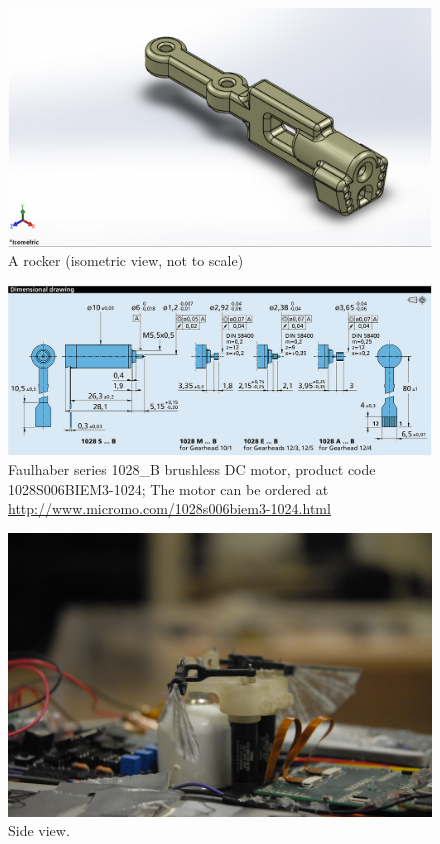 \begin{appendix}
\begin{figure}
\centering
\includegraphics[width=\textwidth]{Files/Figures/rocker.png}
\caption{A rocker (isometric view, not to scale)}
\label{fig:rocker}
\end{figure}

\begin{figure}
\centering
\includegraphics[width=17cm, angle=90]{Files/Figures/motor_drawing.png}
\caption[Faulhaber series 1028B DC motor]{Faulhaber series 1028\_B brushless DC motor, product code 1028S006BIEM3-1024; The motor can be ordered at \url{http://www.micromo.com/1028s006biem3-1024.html}}
\label{fig_drawing_motor}
\end{figure}

\begin{figure}
\centering
\includegraphics[width=12.5cm]{Files/Figures/photo_side.jpg}
\caption{Side view.}
\label{fig_photo_side}
\end{figure}


\end{appendix}
